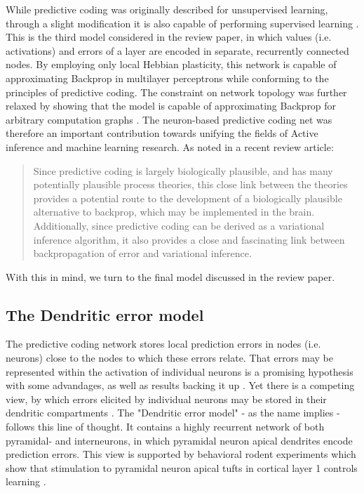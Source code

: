 While predictive coding was originally described for unsupervised learning, through a slight modification it is also
capable of performing supervised learning \citep{Whittington2017}. This is the third model considered in the review
paper, in which values (i.e. activations) and errors of a layer are encoded in separate, recurrently connected nodes. By
employing only local Hebbian plasticity, this network is capable of approximating Backprop in multilayer perceptrons
while conforming to the principles of predictive coding. The constraint on network topology was further relaxed by
showing that the model is capable of approximating Backprop for arbitrary computation graphs \citep{Millidge2022}. The
neuron-based predictive coding net was therefore an important contribution towards unifying the fields of Active
inference and machine learning research. As noted in a recent review article:

\begin{quotation}
  Since predictive coding is largely biologically plausible, and has many potentially plausible process theories, this
  close link between the theories provides a potential route to the development of a biologically plausible alternative to
  backprop, which may be implemented in the brain. Additionally, since predictive coding can be derived as a variational
  inference algorithm, it also provides a close and fascinating link between backpropagation of error and variational
  inference. \citep{millidge2021predictive}
\end{quotation}

With this in mind, we turn to the final model discussed in the review paper.

\subsection{The Dendritic error model}

The predictive coding network stores local prediction errors in nodes (i.e. neurons) close to the nodes to which these
errors relate. That errors may be represented within the activation of individual neurons is a promising hypothesis with
some advandages, as well as results backing it up \citep{Hertaeg2022}. Yet there is a competing view, by which errors
elicited by individual neurons may be stored in their dendritic compartments \citep{guerguiev2017towards}. The
"Dendritic error model" \citep{sacramento2018dendritic} - as the name implies - follows this line of thought. It
contains a highly recurrent network of both pyramidal- and interneurons, in which pyramidal neuron apical dendrites
encode prediction errors. This view is supported by behavioral rodent experiments which show that stimulation to
pyramidal neuron apical tufts in cortical layer 1 controls learning \citep{Doron2020}.

